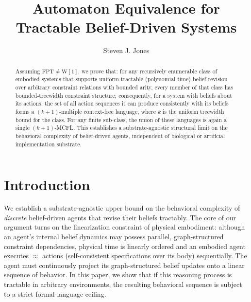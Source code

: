 \documentclass[runningheads]{llncs}
\begin{document}
%
\title{Automaton Equivalence for Tractable Belief-Driven Systems}
%
%
\author{Steven J. Jones}
%
%
%
\maketitle
%
\begin{abstract}
Assuming $\mathrm{FPT} \neq \mathrm{W}[1]$, we prove that: for any recursively enumerable class of embodied systems that supports uniform tractable (polynomial-time) belief revision over arbitrary constraint relations with bounded arity, every member of that class has bounded-treewidth constraint structure; consequently, for a system with beliefs about its actions, the set of all action sequences it can produce consistently with its beliefs forms a $(k{+}1)$-multiple context-free language, where $k$ is the uniform treewidth bound for the class.
For any finite sub-class, the union of these languages is again a single $(k{+}1)$-MCFL.
This establishes a substrate-agnostic structural limit on the behavioral complexity of belief-driven agents, independent of biological or artificial implementation substrate.

\end{abstract}

\section{Introduction}\label{sec:intro}

We establish a substrate-agnostic upper bound on the behavioral complexity of \emph{discrete} belief-driven agents that revise their beliefs tractably.
The core of our argument turns on the linearization constraint of physical embodiment: although an agent's internal belief dynamics may possess parallel, graph-structured constraint dependencies, physical time is linearly ordered and an embodied agent executes $\approx$ actions (self-consistent specifications over its body) sequentially. The agent must continuously project its graph-structured belief updates onto a linear sequence of behavior. In this paper, we show that if this reasoning process is tractable in arbitrary environments, the resulting behavioral sequence is subject to a strict formal-language ceiling.
\end{document}

